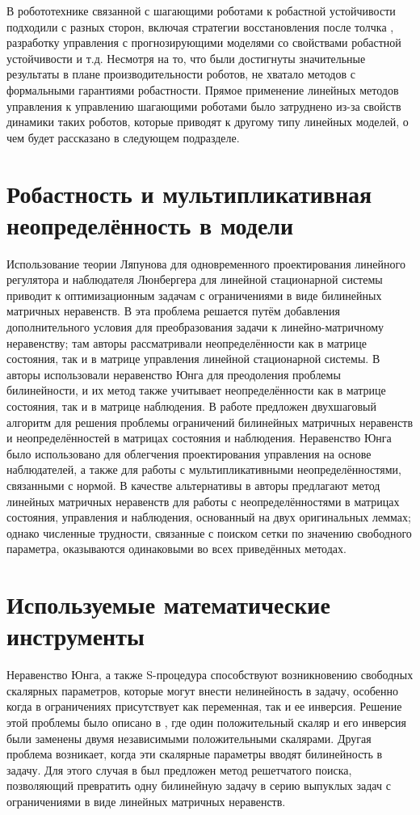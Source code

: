 В робототехнике связанной с шагающими роботами к робастной устойчивости подходили с разных сторон, включая стратегии восстановления после толчка \cite{Pratt2006}, разработку управления с прогнозирующими моделями со свойствами робастной устойчивости \cite{KIM2019} и т.д. Несмотря на то, что были достигнуты значительные результаты в плане производительности роботов, не хватало методов с формальными гарантиями робастности. Прямое применение линейных методов управления к управлению шагающими роботами было затруднено из-за свойств динамики таких роботов, которые приводят к другому типу линейных моделей, о чем будет рассказано в следующем подразделе.

\section{Робастность и мультипликативная неопределённость в модели}\label{sec:ch1/sec5}
Использование теории Ляпунова для одновременного проектирования линейного регулятора и наблюдателя Люнбергера для линейной стационарной системы приводит к оптимизационным задачам с ограничениями в виде билинейных матричных неравенств. В \cite{LIEN2004} эта проблема решается путём добавления дополнительного условия для преобразования задачи к линейно-матричному неравенству; там авторы рассматривали неопределённости как в матрице состояния, так и в матрице управления линейной стационарной системы. В \cite{KHELOUFI2013} авторы использовали неравенство Юнга для преодоления проблемы билинейности, и их метод также учитывает неопределённости как в матрице состояния, так и в матрице наблюдения. В работе \cite{ZEMOUCHE2015} предложен двухшаговый алгоритм для решения проблемы ограничений билинейных матричных неравенств и неопределённостей в матрицах состояния и наблюдения. Неравенство Юнга было использовано для облегчения проектирования управления на основе наблюдателей, а также для работы с мультипликативными неопределённостями, связанными с нормой. В качестве альтернативы в \cite{GRITLI2021} авторы предлагают метод линейных матричных неравенств для работы с неопределённостями в матрицах состояния, управления и наблюдения, основанный на двух оригинальных леммах; однако численные трудности, связанные с поиском сетки по значению свободного параметра, оказываются одинаковыми во всех приведённых методах. 
\section{Используемые математические инструменты}\label{sec:ch1/sec6}
Неравенство Юнга, а также S-процедура \cite{Amato2011,LIEN2008} способствуют возникновению свободных скалярных параметров, которые могут внести нелинейность в задачу, особенно когда в ограничениях присутствует как переменная, так и ее инверсия. Решение этой проблемы было описано в \cite{KHELOUFI2016}, где один положительный скаляр и его инверсия были заменены двумя независимыми положительными скалярами. Другая проблема возникает, когда эти скалярные параметры вводят билинейность в задачу. Для этого случая в \cite{KHELOUFI2013} был предложен метод решетчатого поиска, позволяющий превратить одну билинейную задачу в серию выпуклых задач с ограничениями в виде линейных матричных неравенств.

